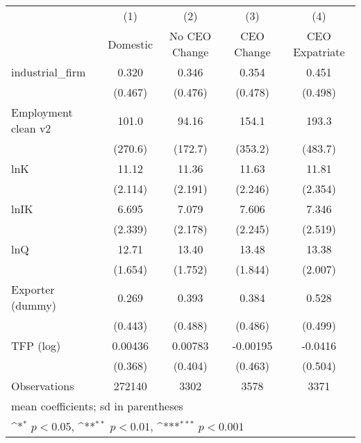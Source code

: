 {
\def\sym#1{\ifmmode^{#1}\else\(^{#1}\)\fi}
\begin{tabular}{l*{4}{c}}
\hline\hline
                    &\multicolumn{1}{c}{(1)}&\multicolumn{1}{c}{(2)}&\multicolumn{1}{c}{(3)}&\multicolumn{1}{c}{(4)}\\
                    &\multicolumn{1}{c}{Domestic}&\multicolumn{1}{c}{No CEO Change}&\multicolumn{1}{c}{CEO Change}&\multicolumn{1}{c}{CEO Expatriate}\\
\hline
industrial\_firm     &       0.320         &       0.346         &       0.354         &       0.451         \\
                    &     (0.467)         &     (0.476)         &     (0.478)         &     (0.498)         \\
[1em]
Employment clean v2 &       101.0         &       94.16         &       154.1         &       193.3         \\
                    &     (270.6)         &     (172.7)         &     (353.2)         &     (483.7)         \\
[1em]
lnK                 &       11.12         &       11.36         &       11.63         &       11.81         \\
                    &     (2.114)         &     (2.191)         &     (2.246)         &     (2.354)         \\
[1em]
lnIK                &       6.695         &       7.079         &       7.606         &       7.346         \\
                    &     (2.339)         &     (2.178)         &     (2.245)         &     (2.519)         \\
[1em]
lnQ                 &       12.71         &       13.40         &       13.48         &       13.38         \\
                    &     (1.654)         &     (1.752)         &     (1.844)         &     (2.007)         \\
[1em]
Exporter (dummy)    &       0.269         &       0.393         &       0.384         &       0.528         \\
                    &     (0.443)         &     (0.488)         &     (0.486)         &     (0.499)         \\
[1em]
TFP (log)           &     0.00436         &     0.00783         &    -0.00195         &     -0.0416         \\
                    &     (0.368)         &     (0.404)         &     (0.463)         &     (0.504)         \\
\hline
Observations        &      272140         &        3302         &        3578         &        3371         \\
\hline\hline
\multicolumn{5}{l}{\footnotesize mean coefficients; sd in parentheses}\\
\multicolumn{5}{l}{\footnotesize \sym{*} \(p<0.05\), \sym{**} \(p<0.01\), \sym{***} \(p<0.001\)}\\
\end{tabular}
}
